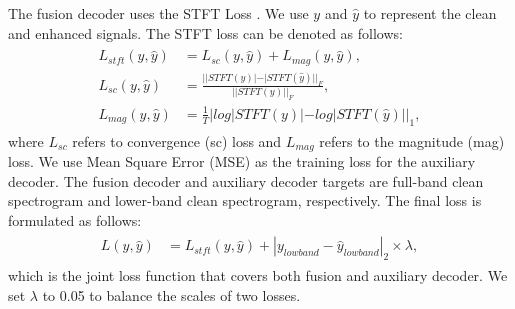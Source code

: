 The fusion decoder uses the STFT Loss \citep{defossez2020real}. We use $y$ and $\hat{y}$ to represent the clean and enhanced signals. The STFT loss can be denoted as follows: 
\begin{align} 
\label{math:stft_loss}
\begin{split}
    L_{stft}(y, \hat{y}) &= L_{sc}(y, \hat{y}) + L_{mag}(y, \hat{y}),
    \\
    L_{sc}(y, \hat{y}) &= \frac{||STFT(y)| - |STFT(\hat{y})||_{F}}{||STFT(y)||_{F}},
    \\
    L_{mag}(y, \hat{y}) &= \frac{1}{T}|log|STFT(y)| - log|STFT(\hat{y})||_{1},
\end{split}
\end{align} 
where $L_{sc}$ refers to convergence
(sc) loss and $L_{mag}$ refers to the magnitude (mag) loss.
We use Mean Square Error (MSE) as the training loss for the auxiliary decoder. The fusion decoder and auxiliary decoder targets are full-band clean spectrogram and lower-band clean spectrogram, respectively. The final loss is formulated as follows: 
\begin{align} 
\label{math:overall_loss}
\begin{split}
    L(y, \hat{y}) &= L_{stft}(y, \hat{y}) + |y_{lowband} - \hat{y}_{lowband}|_{2} \times \lambda,
\end{split}
\end{align}
which is the joint loss function that covers both fusion and auxiliary decoder. We set $\lambda$ to 0.05 to balance the scales of two losses.

